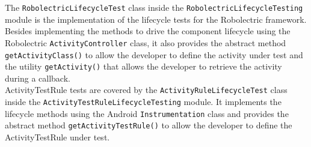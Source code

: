 \documentclass[11pt,a4paper,notitlepage]{article}
\begin{document}
The \texttt{RobolectricLifecycleTest} class inside the  \texttt{RobolectricLifecycleTesting} module is the implementation of the lifecycle tests for the Robolectric framework. Besides implementing the methods to drive the component lifecycle using the Robolectric \texttt{ActivityController} class, it also provides the abstract method \texttt{getActivityClass()} to allow the developer to define the activity under test and the utility \texttt{getActivity()} that allows the developer to retrieve the activity during a callback.\bigskip \\
ActivityTestRule tests are covered by the \texttt{ActivityRuleLifecycleTest} class inside the \texttt{ActivityTestRuleLifecycleTesting} module. It implements the lifecycle methods using the Android \texttt{Instrumentation} class and provides the abstract method \texttt{getActivityTestRule()} to allow the developer to define the ActivityTestRule under test.
\end{document}
